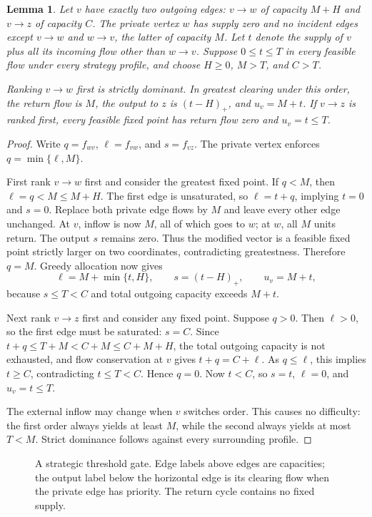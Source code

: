 \documentclass[11pt]{article}
\newtheorem{lemma}[theorem]{Lemma}
\newcommand{\pos}[1]{(#1)_+}
\begin{document}
\begin{lemma}\label{lem:gate}
Let $v$ have exactly two outgoing edges: $v\to w$ of capacity $M+H$ and $v\to z$ of capacity $C$. The private vertex $w$ has supply zero and no incident edges except $v\to w$ and $w\to v$, the latter of capacity $M$. Let $t$ denote the supply of $v$ plus all its incoming flow other than $w\to v$. Suppose $0\le t\le T$ in every feasible flow under every strategy profile, and choose $H\ge0$, $M>T$, and $C>T$.

Ranking $v\to w$ first is strictly dominant. In greatest clearing under this order, the return flow is $M$, the output to $z$ is $\pos{t-H}$, and $u_v=M+t$. If $v\to z$ is ranked first, every feasible fixed point has return flow zero and $u_v=t\le T$.
\end{lemma}
\begin{proof}
Write $q=f_{wv}$, $\ell=f_{vw}$, and $s=f_{vz}$. The private vertex enforces $q=\min\{\ell,M\}$.

First rank $v\to w$ first and consider the greatest fixed point. If $q<M$, then $\ell=q<M\le M+H$. The first edge is unsaturated, so $\ell=t+q$, implying $t=0$ and $s=0$. Replace both private edge flows by $M$ and leave every other edge unchanged. At $v$, inflow is now $M$, all of which goes to $w$; at $w$, all $M$ units return. The output $s$ remains zero. Thus the modified vector is a feasible fixed point strictly larger on two coordinates, contradicting greatestness. Therefore $q=M$. Greedy allocation now gives
\[
 \ell=M+\min\{t,H\},\qquad s=\pos{t-H},\qquad u_v=M+t,
\]
because $s\le T<C$ and total outgoing capacity exceeds $M+t$.

Next rank $v\to z$ first and consider any fixed point. Suppose $q>0$. Then $\ell>0$, so the first edge must be saturated: $s=C$. Since $t+q\le T+M<C+M\le C+M+H$, the total outgoing capacity is not exhausted, and flow conservation at $v$ gives $t+q=C+\ell$. As $q\le\ell$, this implies $t\ge C$, contradicting $t\le T<C$. Hence $q=0$. Now $t<C$, so $s=t$, $\ell=0$, and $u_v=t\le T$.

The external inflow may change when $v$ switches order. This causes no difficulty: the first order always yields at least $M$, while the second always yields at most $T<M$. Strict dominance follows against every surrounding profile.
\end{proof}

\begin{figure}[ht]
\centering
{}
\caption{A strategic threshold gate. Edge labels above edges are capacities; the output label below the horizontal edge is its clearing flow when the private edge has priority. The return cycle contains no fixed supply.}
\label{fig:gate}
\end{figure}
\end{document}

